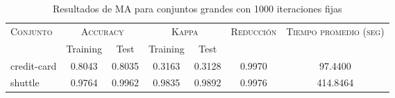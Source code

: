 \begin{table}[]
\centering
\begin{tabular}{l c c c c c c}
\hline
\multirow{2}{*}{\textsc{Conjunto}}
	& \multicolumn{2}{c}{\textsc{Accuracy}}
	& \multicolumn{2}{c}{\textsc{Kappa}}
	& \textsc{Reducción}
	& \textsc{Tiempo promedio (seg)} \\
	& Training & Test
	& Training & Test \\ 
\hline
\hline

credit-card & 0.8043 & 0.8035 & 0.3163 & 0.3128 & 0.9970 & 97.4400 \\
shuttle & 0.9764 & 0.9962 & 0.9835 & 0.9892 & 0.9976 & 414.8464 \\

\hline
\end{tabular}
\caption{Resultados de MA para conjuntos grandes con 1000 iteraciones fijas}
\label{res-grande-ma}
\end{table}

